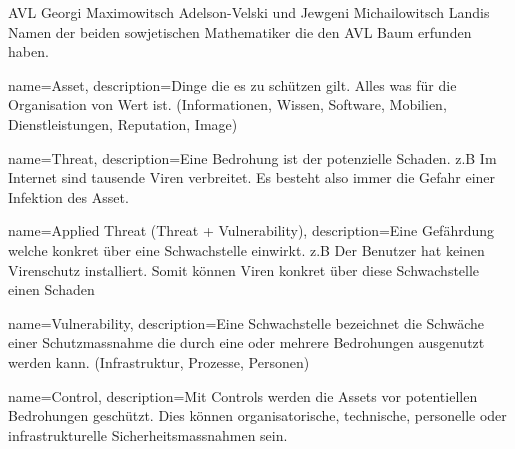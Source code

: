 {AVL}
{Georgi Maximowitsch Adelson-Velski und Jewgeni Michailowitsch Landis}
{
	Namen der beiden sowjetischen Mathematiker die den AVL Baum erfunden haben.
}

{
	name={Asset},
	description={Dinge die es zu schützen gilt. Alles was für die Organisation von Wert ist. (Informationen, Wissen, Software, Mobilien, Dienstleistungen, Reputation, Image)
	}
}

{
	name={Threat},
	description={Eine Bedrohung ist der potenzielle Schaden. z.B Im Internet sind tausende Viren verbreitet. Es besteht also immer die Gefahr einer Infektion des Asset.
	}
}

{
	name={Applied Threat (Threat + Vulnerability)},
	description={Eine Gefährdung welche konkret über eine Schwachstelle einwirkt. z.B Der Benutzer hat keinen Virenschutz installiert. Somit können Viren konkret über diese Schwachstelle einen Schaden}
}

{
	name={Vulnerability},
	description={Eine Schwachstelle bezeichnet die Schwäche einer Schutzmassnahme die durch eine oder mehrere Bedrohungen ausgenutzt werden kann. (Infrastruktur, Prozesse, Personen)
	}
}

{
	name={Control},
	description={Mit Controls werden die Assets vor potentiellen Bedrohungen geschützt. Dies können organisatorische, technische, personelle oder infrastrukturelle Sicherheitsmassnahmen sein.
	}
}